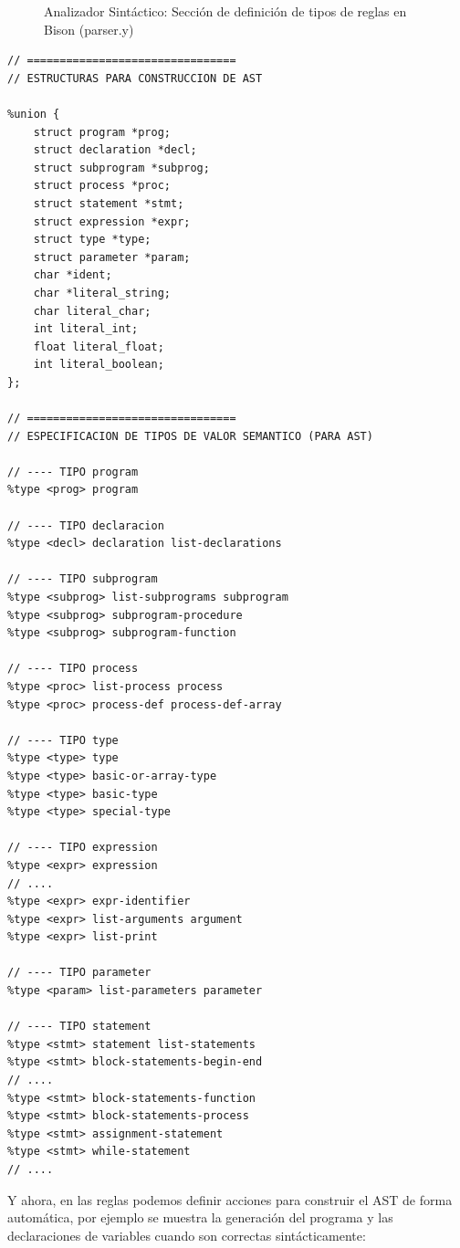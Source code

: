 \newpage
\begin{figure}[h]
\caption{Analizador Sintáctico: Sección de definición de tipos de reglas en Bison (parser.y)}
\label{fig:bisonASTuniontype}
\end{figure}
\begin{lstlisting}[style=customflex]
// ================================
// ESTRUCTURAS PARA CONSTRUCCION DE AST

%union {
    struct program *prog;
    struct declaration *decl;
    struct subprogram *subprog;
    struct process *proc;
    struct statement *stmt;
    struct expression *expr;
    struct type *type;
    struct parameter *param;
    char *ident;
    char *literal_string;
    char literal_char;
    int literal_int;
    float literal_float;
    int literal_boolean;
};

// ================================
// ESPECIFICACION DE TIPOS DE VALOR SEMANTICO (PARA AST)

// ---- TIPO program
%type <prog> program

// ---- TIPO declaracion
%type <decl> declaration list-declarations

// ---- TIPO subprogram
%type <subprog> list-subprograms subprogram
%type <subprog> subprogram-procedure
%type <subprog> subprogram-function

// ---- TIPO process
%type <proc> list-process process 
%type <proc> process-def process-def-array

// ---- TIPO type
%type <type> type
%type <type> basic-or-array-type
%type <type> basic-type
%type <type> special-type

// ---- TIPO expression
%type <expr> expression 
// ....
%type <expr> expr-identifier
%type <expr> list-arguments argument
%type <expr> list-print

// ---- TIPO parameter
%type <param> list-parameters parameter

// ---- TIPO statement
%type <stmt> statement list-statements
%type <stmt> block-statements-begin-end
// ....
%type <stmt> block-statements-function
%type <stmt> block-statements-process
%type <stmt> assignment-statement 
%type <stmt> while-statement 
// ....
\end{lstlisting}

\vspace{0.5cm}

\noindent
Y ahora, en las reglas podemos definir acciones para construir el AST de forma automática, por ejemplo se muestra la generación del programa y las declaraciones de variables cuando son correctas sintácticamente:

